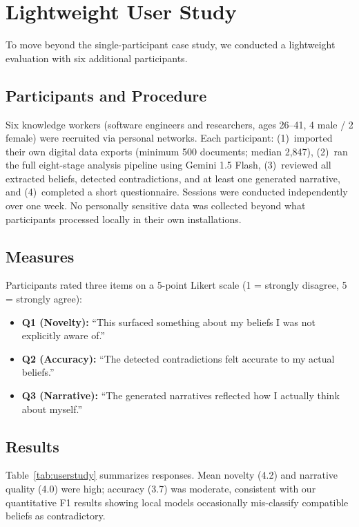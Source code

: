\documentclass[conference]{IEEEtran}
\begin{document}
\section{Lightweight User Study}
\label{sec:userstudy}

To move beyond the single-participant case study, we conducted a lightweight evaluation with six additional participants.

\subsection{Participants and Procedure}

Six knowledge workers (software engineers and researchers, ages 26--41, 4 male / 2 female) were recruited via personal networks. Each participant: (1)~imported their own digital data exports (minimum 500 documents; median 2,847), (2)~ran the full eight-stage analysis pipeline using Gemini 1.5 Flash, (3)~reviewed all extracted beliefs, detected contradictions, and at least one generated narrative, and (4)~completed a short questionnaire. Sessions were conducted independently over one week. No personally sensitive data was collected beyond what participants processed locally in their own installations.

\subsection{Measures}

Participants rated three items on a 5-point Likert scale (1 = strongly disagree, 5 = strongly agree):

\begin{itemize}
  \item \textbf{Q1 (Novelty):} ``This surfaced something about my beliefs I was not explicitly aware of.''
  \item \textbf{Q2 (Accuracy):} ``The detected contradictions felt accurate to my actual beliefs.''
  \item \textbf{Q3 (Narrative):} ``The generated narratives reflected how I actually think about myself.''
\end{itemize}

\subsection{Results}

Table~\ref{tab:userstudy} summarizes responses. Mean novelty (4.2) and narrative quality (4.0) were high; accuracy (3.7) was moderate, consistent with our quantitative F1 results showing local models occasionally mis-classify compatible beliefs as contradictory.
\end{document}
